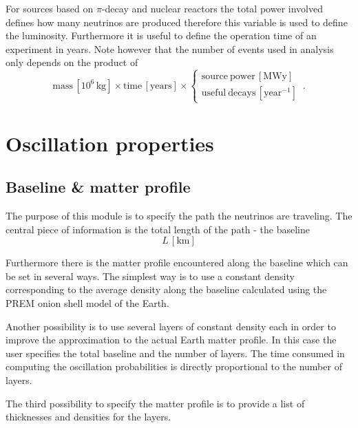 For sources based on $\pi$-decay and nuclear reactors the total power
involved defines how many neutrinos are produced therefore this variable is
used to define the luminosity. Furthermore it is useful to define 
the operation time of an experiment in years. Note however that the 
number of events used in analysis only depends on the product of
\begin{equation}
\mathrm{mass}\,\left[10^6\,\mathrm{kg}\right]\times \mathrm{time}
\,\left[\mathrm{years}\right]\times\left\{ \begin{array}{c}
\mathrm{source~power}\,\left[\mathrm{MWy}\right]\\
\mathrm{useful~decays}\,\left[\mathrm{year}^{-1}\right]
\end{array}\right.\,.
\end{equation}
\section{Oscillation properties}



\subsection{Baseline \& matter profile}
The purpose of this module is to specify the path the neutrinos
are traveling. The central piece of information is the total length
of the path - the baseline
\begin{equation}
L\,\left[\mathrm{km}\right]
\end{equation} 

Furthermore there is
the matter profile encountered along the baseline which can be set in
several ways. The simplest way is to use a constant density corresponding
to the average density along the baseline calculated using the 
PREM\cite{Stacey} onion shell model of the 
Earth.

Another possibility is to use several layers of constant density each in 
order to improve the approximation to the actual Earth matter profile. In this
case the user specifies the total baseline and the number of layers. The
time consumed in computing the oscillation probabilities is directly 
proportional to the number of layers.

The third possibility to specify the matter profile is to provide a list
of thicknesses and densities for the layers. 

